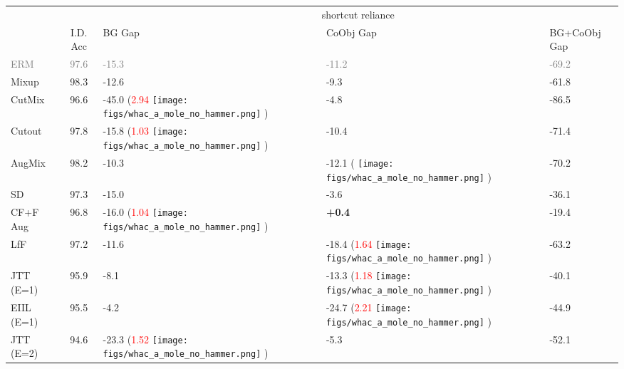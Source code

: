 \documentclass[10pt,twocolumn,letterpaper]{article}
\DeclareRobustCommand{\molenohammer}{\begingroup\normalfont
  \texttt{[image: figs/whac\_a\_mole\_no\_hammer.png]}\endgroup
}
\begin{document}
\begin{table}[t]
\centering
\begin{adjustbox}{width=\linewidth}
\begin{tabular}{@{}lclll@{}}
\toprule
                    & \multicolumn{1}{c|}{}                    & \multicolumn{3}{c}{shortcut reliance}               \\ \cmidrule(l){3-5}
                    & \multicolumn{1}{c|}{I.D. Acc} & BG Gap       & CoObj Gap   & BG+CoObj Gap    \\ \midrule
\textcolor{gray}{ERM}        & \textcolor{gray}{97.6}        & \textcolor{gray}{-15.3}         & \textcolor{gray}{-11.2}         & \textcolor{gray}{-69.2}        \\ \midrule
Mixup               & 98.3                                   & -12.6         & -9.3          & -61.8         \\
CutMix              & 96.6                                   & -45.0 (\textcolor{red}{2.94} \molenohammer)        & -4.8          & -86.5         \\
Cutout              & 97.8                                   & -15.8 (\textcolor{red}{1.03} \molenohammer)        & -10.4         & -71.4         \\
AugMix              & 98.2                                   & -10.3         & -12.1 (\textcolor{red}{} \molenohammer)         & -70.2         \\
SD                  & 97.3                                   & -15.0         & -3.6          & -36.1         \\ \midrule
CF+F Aug            & 96.8                                   & -16.0 (\textcolor{red}{1.04} \molenohammer)         & \textbf{+0.4}         & -19.4         \\ \midrule
LfF                 & 97.2                                   & -11.6          & -18.4 (\textcolor{red}{1.64} \molenohammer)        & -63.2         \\
JTT (E=1)           & 95.9                                   & -8.1          & -13.3 (\textcolor{red}{1.18} \molenohammer)        & -40.1         \\
EIIL (E=1)          & 95.5                                   & -4.2          & -24.7 (\textcolor{red}{2.21} \molenohammer)        & -44.9         \\
JTT (E=2)           & 94.6                                   & -23.3  (\textcolor{red}{1.52} \molenohammer)       & -5.3          & -52.1         \\

\end{tabular}
\end{adjustbox}
\end{table}
\end{document}
